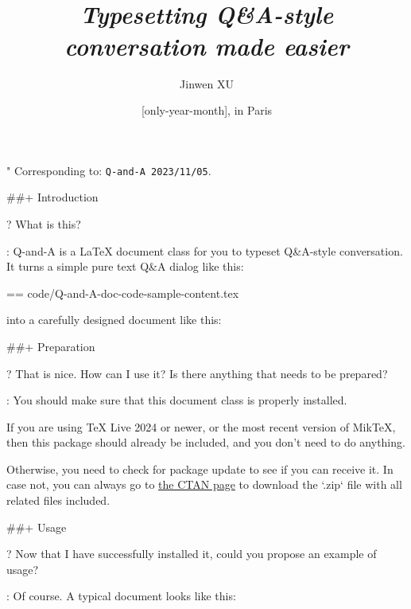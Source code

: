 \documentclass[%
  use style = classical,
  scroll,
]{Q-and-A}
\title{\QApackage{}\\\smallskip\itshape Typesetting Q\&A-style conversation made easier}
\author{Jinwen XU}
\date{\TheDate{\PackageVersion}[only-year-month], in Paris}
\def\PackageVersion{2023/11/05}
\def\PackageSubVersion{}
\newcommand{\QApackage}{{\normalfont\textsf{Q-and-A}}}
\begin{document}
\maketitle

"
  Corresponding to: {\normalfont\texttt{\QApackage{}~\PackageVersion\PackageSubVersion}}.


##+ {Introduction}

?
  What is this?

:
  \QApackage{} is a \LaTeX{} document class for you to typeset Q\&A-style conversation. It turns a simple pure text Q\&A dialog like this:

  == {code/Q-and-A-doc-code-sample-content.tex}

  into a carefully designed document like this:

  \begin{center}
  \end{center}


##+ {Preparation}

?
  That is nice. How can I use it? Is there anything that needs to be prepared?

:
  You should make sure that this document class is properly installed.

  If you are using TeX Live 2024 or newer, or the most recent version of MikTeX, then this package should already be included, and you don't need to do anything.

  Otherwise, you need to check for package update to see if you can receive it. In case not, you can always go to \href{https://ctan.org/pkg/Q-and-A}{the CTAN page} to download the `.zip` file with all related files included.


##+ {Usage}

?
  Now that I have successfully installed it, could you propose an example of usage?

:
  Of course. A typical document looks like this:
\end{document}
